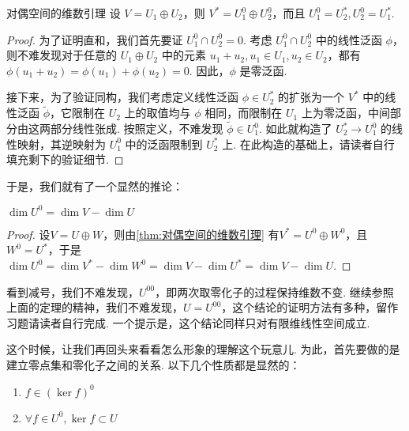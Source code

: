\begin{theorem}{}{对偶空间的维数引理}
    设 $V = U_1 \oplus U_2$，则 $V^* = U_1^0 \oplus U_2^0$，而且 $U_1^0 = U_2^*, U_2^0 = U_1^*$.
\end{theorem}


\begin{proof}
    为了证明直和，我们首先要证 $U_1^0 \cap U_2^0 = 0$. 考虑 $U_1^0 \cap U_2^0$ 中的线性泛函 $\phi$，则不难发现对于任意的 $U_1 \oplus U_2$ 中的元素 $u_1 + u_2, u_1 \in U_1, u_2 \in U_2$，都有 $\phi(u_1 + u_2) = \phi(u_1) + \phi(u_2) = 0$. 因此，$\phi$ 是零泛函.

    接下来，为了验证同构，我们考虑定义线性泛函 $\phi \in U_2^*$ 的扩张为一个 $V^*$ 中的线性泛函 $\tilde{\phi}$，它限制在 $U_2$ 上的取值均与 $\phi$ 相同，而限制在 $U_1$ 上为零泛函，中间部分由这两部分线性张成. 按照定义，不难发现 $\tilde \phi \in U_1^0$. 如此就构造了 $U_2^* \to U_1^0$ 的线性映射，其逆映射为 $U_1^0$ 中的泛函限制到 $U_2^*$ 上. 在此构造的基础上，请读者自行填充剩下的验证细节.
\end{proof}

于是，我们就有了一个显然的推论：

\begin{theorem}{}{}
    $\dim U^0 = \dim V - \dim U$
\end{theorem}
\begin{proof}
    设$V=U\oplus W$，则由\autoref{thm:对偶空间的维数引理} 有$V^*=U^0\oplus W^0$，且$W^0=U^*$，于是$\dim U^0=\dim V^*-\dim W^0=\dim V-\dim U^*=\dim V-\dim U$.
\end{proof}
看到减号，我们不难发现，$U^{00}$，即两次取零化子的过程保持维数不变. 继续参照上面的定理的精神，我们不难发现，$U = U^{00}$，这个结论的证明方法有多种，留作习题请读者自行完成. 一个提示是，这个结论同样只对有限维线性空间成立.

这个时候，让我们再回头来看看怎么形象的理解这个玩意儿. 为此，首先要做的是建立零点集和零化子之间的关系. 以下几个性质都是显然的：

\begin{lemma}{}{}
    \begin{enumerate}
        \item $f \in (\ker f)^0$
        \item $\forall f \in U^0, \ker f \subset U$
    \end{enumerate}
\end{lemma}

